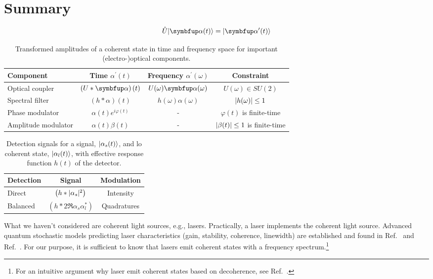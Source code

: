 \section*{Summary}

\begin{equation}
	\hat{U}
	\ket{\vb{\alpha}(t)}
	=
	\ket{\vb{\alpha}^\prime(t)}
\end{equation}

\begin{table}[htb]
	\centering	
	\begin{tabular}{lccc}
		\toprule
			Component & Time $\alpha^\prime(t)$ & Frequency $\alpha^\prime(\omega)$ & Constraint \\
		\midrule
			Optical coupler & $\left(U*\vb{\alpha}\right)(t)$ & $U(\omega)\vb{\alpha}(\omega)$ & $U(\omega)\in SU(2)$ \\
			Spectral filter & $\left(h*\alpha\right)(t)$ & $h(\omega)\alpha(\omega)$ & $\lvert h(\omega)\rvert\leq1$ \\
			Phase modulator & $\alpha(t)e^{i\varphi(t)}$ & - & $\varphi(t)$ is finite-time \\
			Amplitude modulator & $\alpha(t)\beta(t)$ & - & $\lvert\beta(t)\rvert\leq1$ is finite-time \\
		\bottomrule
	\end{tabular}
	\caption{Transformed amplitudes of a coherent state in time and frequency space for important (electro-)optical components.}
\end{table}

\begin{table}[htb]
	\centering	
	\begin{tabular}{lcc}
		\toprule
			Detection & Signal & Modulation \\
		\midrule
			Direct & $\left(h*\lvert\alpha_s\rvert^2\right)$ & Intensity \\
			Balanced & $\left(h*2\Re{\alpha_s\alpha_l^*}\right)$ & Quadratures \\
		\bottomrule
	\end{tabular}
	\caption{Detection signals for a signal, $\lvert\alpha_s(t)\rangle$, and \gls{lo} coherent state, $\lvert\alpha_l(t)\rangle$, with effective response function $h(t)$ of the detector.}
\end{table}

What we haven't considered are coherent light sources, e.g., lasers.
Practically, a laser implements the coherent light source.
Advanced quantum stochastic models predicting laser characteristics (gain, stability, coherence, linewidth) are established and found in  Ref.~\cite[p.~900]{Mandel1995} and Ref.~\cite{Haken2012}.
For our purpose, it is sufficient to know that lasers emit coherent states with a frequency spectrum.\footnote{For an intuitive argument why laser emit coherent states based on decoherence, see Ref.~\cite{Gea1998}.}